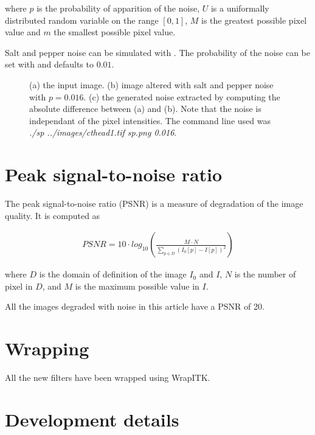 \documentclass{InsightArticle}
\begin{document}
where $p$ is the probability of apparition of the noise, $U$ is a uniformally distributed
random variable on the range $[0, 1]$, $M$ is the greatest possible pixel value and $m$ the
smallest possible pixel value.

Salt and pepper noise can be simulated with . The probability
of the noise can be set with  and defaults to $0.01$.

\begin{figure}[htbp]
\begin{center}
\caption{(a) the input image. (b) image altered with salt and pepper noise with $p = 0.016$.
(c) the generated noise extracted by computing the absolute difference between (a)
and (b). Note that the noise is independant of the pixel intensities.
The command line used was {\em ./sp ../images/cthead1.tif sp.png 0.016}.}
\end{center}
\end{figure}

\section{Peak signal-to-noise ratio}

The peak signal-to-noise ratio (PSNR) is a measure of degradation of the image quality.
It is computed as

\begin{eqnarray}
PSNR = 10 \cdot log_{10}\left(\frac{M \cdot N}{\underset{p \in D}{\sum} (I_0[p]-I[p])^2}\right)
\end{eqnarray}

where $D$ is the domain of definition of the image $I_0$ and $I$, $N$ is the number of pixel in $D$,
and $M$ is the maximum possible value in $I$.

All the images degraded with noise in this article have a PSNR of 20.

\section{Wrapping}

All the new filters have been wrapped using WrapITK.

\section{Development details}
\end{document}

